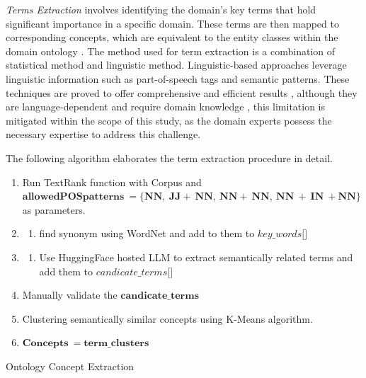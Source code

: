 \emph{Terms Extraction} involves identifying the domain's key terms that
hold significant importance in a specific domain. These terms are then
mapped to corresponding concepts, which are equivalent to the entity
classes within the domain ontology \autocite{Hulth2003}. The method used for
term extraction is a combination of statistical method and linguistic
method. Linguistic-based approaches leverage linguistic information such
as part-of-speech tags and semantic patterns. These techniques are
proved to offer comprehensive and efficient results \autocite{Aman2018}, although they are language-dependent and require domain knowledge
\autocite{Aman2018}, this limitation is mitigated within the
scope of this study, as the domain experts possess the necessary
expertise to address this challenge.

The following algorithm elaborates the term extraction procedure in
detail.

\setlength{\algomargin}{2em} %
\begin{algorithm}
	\DontPrintSemicolon
	
	\begin{enumerate}
	\item 
	 Run TextRank function with Corpus and
	  \(\mathbf{allowedPOSpatterns\  = \{ NN,\ JJ + \ NN,\ NN + \ NN,\ NN\  + \ IN\  + NN\}}\)
	  as parameters.
	  \item 
	  			{
	  			\begin{enumerate}
	  				\def\labelenumii{\alph{enumii}.}
	  			\item
	  			  find synonym using WordNet and add to them to
	  			  \(key\_ words\lbrack\rbrack\)
	  			\end{enumerate}
	  			
	  			}\label{endfor}
	  \item 
	  
	  	  			{
	  	  		\begin{enumerate}
	  	  			  				\def\labelenumii{\alph{enumii}.}
	  	  			\item
	  	  			 Use HuggingFace hosted LLM to extract semantically related terms and
	  	  			   add them to \(candicate\_ terms\lbrack\rbrack\)
	  	  			\end{enumerate}
	  	  			
	  	  			}\label{endfor}
	  \item
	    Manually validate the \(\mathbf{candicate}\mathbf{\_}\mathbf{terms}\)
	  \item
	    Clustering semantically similar concepts using K-Means algorithm.
	  \item
	    \(\mathbf{Concepts\  = term\_ clusters}\)
	\end{enumerate}
	
\caption{Ontology Concept Extraction}\label{alg:onto-ce}
\end{algorithm}

